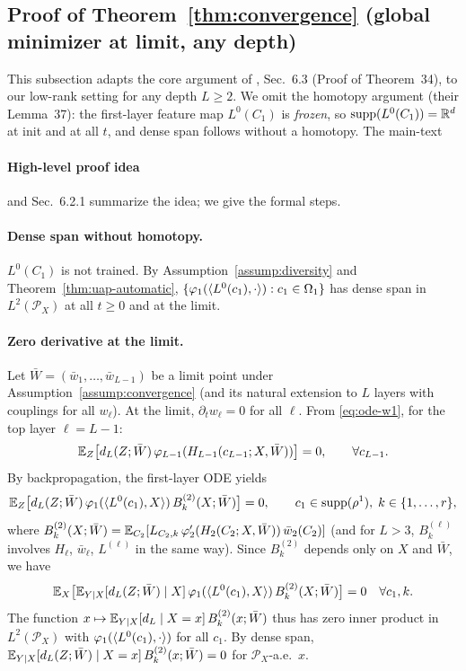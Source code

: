 \documentclass[nohyperref]{article}
\theoremstyle{plain}
\theoremstyle{definition}
\theoremstyle{remark}
\begin{document}
\subsection{Proof of Theorem~\ref{thm:convergence} (global minimizer at limit, any depth)}
\label{app:proof-thm-convergence}

This subsection adapts the core argument of \cite{nguyen2023rigorousframeworkmeanfield}, Sec.~6.3 (Proof of Theorem~34), to our low-rank setting for any depth $L\ge 2$. We omit the homotopy argument (their Lemma~37): the first-layer feature map $L^0(C_1)$ is \emph{frozen}, so $\text{supp}(L^0(C_1))=\R^d$ at init and at all $t$, and dense span follows without a homotopy. The main-text \paragraph{High-level proof idea} and \cite{nguyen2023rigorousframeworkmeanfield} Sec.~6.2.1 summarize the idea; we give the formal steps.

\paragraph{Dense span without homotopy.}
$L^0(C_1)$ is not trained. By Assumption~\ref{assump:diversity} and Theorem~\ref{thm:uap-automatic}, $\{\varphi_1(\langle L^0(c_1), \cdot \rangle): c_1\in\Omega_1\}$ has dense span in $L^2(\mathcal{P}_X)$ at all $t\ge 0$ and at the limit.

\paragraph{Zero derivative at the limit.}
Let $\bar W=(\bar{w}_1,\ldots,\bar{w}_{L-1})$ be a limit point under Assumption~\ref{assump:convergence} (and its natural extension to $L$ layers with couplings for all $w_\ell$). At the limit, $\partial_t w_\ell=0$ for all $\ell$. From \eqref{eq:ode-w1}, for the top layer $\ell=L-1$:
\[
\mathbb{E}_Z\bigl[d_L(Z;\bar W)\,\varphi_{L-1}(H_{L-1}(c_{L-1};X,\bar W))\bigr]=0,\qquad \forall c_{L-1}.
\]
By backpropagation, the first-layer ODE yields
\[
\mathbb{E}_Z\bigl[d_L(Z;\bar W)\,\varphi_1(\langle L^0(c_1), X \rangle)\,B_k^{(2)}(X;\bar W)\bigr]=0,\qquad c_1\in\text{supp}(\rho^1),\; k\in\{1,\ldots,r\},
\]
where $B_k^{(2)}(X;\bar W)=\mathbb{E}_{C_2}[L_{C_2,k}\,\varphi_2'(H_2(C_2;X,\bar W))\,\bar{w}_2(C_2)]$ (and for $L>3$, $B_k^{(\ell)}$ involves $H_\ell$, $\bar{w}_\ell$, $L^{(\ell)}$ in the same way). Since $B_k^{(2)}$ depends only on $X$ and $\bar W$, we have
\[
\mathbb{E}_X\bigl[\mathbb{E}_{Y|X}[d_L(Z;\bar W)\mid X]\,\varphi_1(\langle L^0(c_1), X \rangle)\,B_k^{(2)}(X;\bar W)\bigr]=0\quad \forall c_1,k.
\]
The function $x\mapsto \mathbb{E}_{Y|X}[d_L\mid X=x]\,B_k^{(2)}(x;\bar W)$ thus has zero inner product in $L^2(\mathcal{P}_X)$ with $\varphi_1(\langle L^0(c_1), \cdot \rangle)$ for all $c_1$. By dense span, $\mathbb{E}_{Y|X}[d_L(Z;\bar W)\mid X=x]\,B_k^{(2)}(x;\bar W)=0$ for $\mathcal{P}_X$-a.e.\ $x$.
\end{document}

